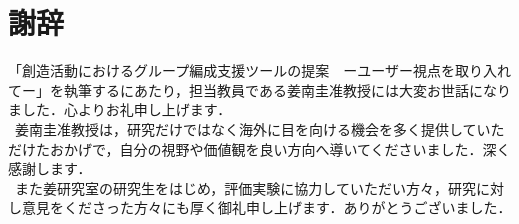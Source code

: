 \documentclass{funthesis}
\begin{document}
\chapter*{謝辞}
「創造活動におけるグループ編成支援ツールの提案　ーユーザー視点を取り入れてー」を執筆するにあたり，担当教員である姜南圭准教授には大変お世話になりました．心よりお礼申し上げます．\\
\ 姜南圭准教授は，研究だけではなく海外に目を向ける機会を多く提供していただけたおかげで，自分の視野や価値観を良い方向へ導いてくださいました．深く感謝します．\\
\ また姜研究室の研究生をはじめ，評価実験に協力していただい方々，研究に対し意見をくださった方々にも厚く御礼申し上げます．ありがとうございました．
\end{document}
